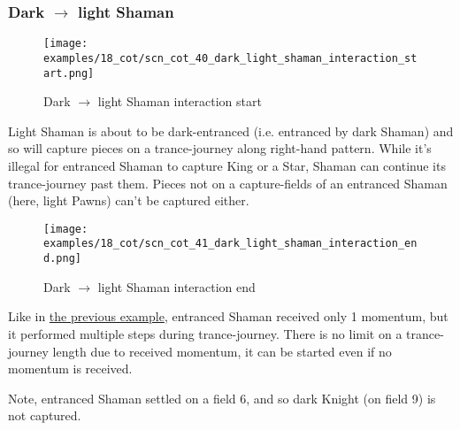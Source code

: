 \clearpage %

\subsubsection*{Dark $\rightarrow$ light Shaman}
\label{sec:Conquest of Tlalocan/Trance-journey/Interactions/Dark --> light Shaman}

\vspace*{-1.4\baselineskip}
\noindent
\begin{figure}[!h]
\texttt{[image: examples/18\_cot/scn\_cot\_40\_dark\_light\_shaman\_interaction\_start.png]}
\caption{Dark $\rightarrow$ light Shaman interaction start}
\label{fig:scn_cot_40_dark_light_shaman_interaction_start}
\end{figure}

Light Shaman is about to be dark-entranced (i.e. entranced by dark Shaman) and
so will capture pieces on a trance-journey along right-hand pattern. While it's
illegal for entranced Shaman to capture King or a Star, Shaman can continue its
trance-journey past them. Pieces not on a capture-fields of an entranced Shaman
(here, light Pawns) can't be captured either.

\clearpage %

\noindent
\begin{figure}[!h]
\texttt{[image: examples/18\_cot/scn\_cot\_41\_dark\_light\_shaman\_interaction\_end.png]}
\caption{Dark $\rightarrow$ light Shaman interaction end}
\label{fig:scn_cot_41_dark_light_shaman_interaction_end}
\end{figure}

Like in
\hyperref[fig:scn_cot_38_light_light_shaman_interaction_start]{the previous example},
entranced Shaman received only 1 momentum, but it performed multiple steps during
trance-journey. There is no limit on a trance-journey length due to received momentum,
it can be started even if no momentum is received.

Note, entranced Shaman settled on a field 6, and so dark Knight (on field 9) is not
captured.

\clearpage %

